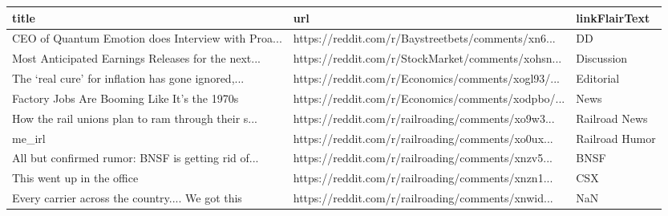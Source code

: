 \documentclass{article}%
\begin{document}
%


\begin{table}[htbp]%
\centering%
\begin{adjustbox}{width=1\textwidth}%
\begin{tabular}{lll}
\toprule
                                             title &                                                url &  linkFlairText \\
\midrule
CEO of Quantum Emotion does Interview with Proa... & https://reddit.com/r/Baystreetbets/comments/xn6... &             DD \\
Most Anticipated Earnings Releases for the next... & https://reddit.com/r/StockMarket/comments/xohsn... &     Discussion \\
The ‘real cure’ for inflation has gone ignored,... & https://reddit.com/r/Economics/comments/xogl93/... &      Editorial \\
      Factory Jobs Are Booming Like It’s the 1970s & https://reddit.com/r/Economics/comments/xodpbo/... &           News \\
How the rail unions plan to ram through their s... & https://reddit.com/r/railroading/comments/xo9w3... &  Railroad News \\
                                            me_irl & https://reddit.com/r/railroading/comments/xo0ux... & Railroad Humor \\
All but confirmed rumor: BNSF is getting rid of... & https://reddit.com/r/railroading/comments/xnzv5... &           BNSF \\
                        This went up in the office & https://reddit.com/r/railroading/comments/xnzn1... &            CSX \\
  Every carrier across the country.... We got this & https://reddit.com/r/railroading/comments/xnwid... &            NaN \\
\bottomrule
\end{tabular}
%
\end{adjustbox}%
\end{table}

%
\end{document}

